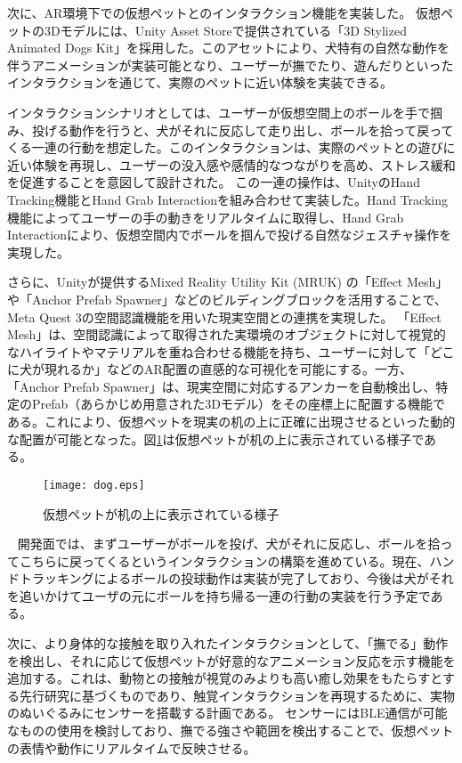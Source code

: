 \documentclass[a4j]{ltjsarticle}
\newcounter{seccnt}
\newcommand{\usection}[1]{\ \newline{\bf\underline{\theseccnt\stepcounter{seccnt}. #1}\hspace{10pt}}}
\begin{document}
次に、AR環境下での仮想ペットとのインタラクション機能を実装した。
仮想ペットの3Dモデルには、Unity Asset Storeで提供されている「3D Stylized Animated Dogs Kit」を採用した。このアセットにより、犬特有の自然な動作を伴うアニメーションが実装可能となり、ユーザーが撫でたり、遊んだりといったインタラクションを通じて、実際のペットに近い体験を実装できる。

インタラクションシナリオとしては、ユーザーが仮想空間上のボールを手で掴み、投げる動作を行うと、犬がそれに反応して走り出し、ボールを拾って戻ってくる一連の行動を想定した。このインタラクションは、実際のペットとの遊びに近い体験を再現し、ユーザーの没入感や感情的なつながりを高め、ストレス緩和を促進することを意図して設計された。
この一連の操作は、UnityのHand Tracking機能とHand Grab Interactionを組み合わせて実装した。Hand Tracking機能によってユーザーの手の動きをリアルタイムに取得し、Hand Grab Interactionにより、仮想空間内でボールを掴んで投げる自然なジェスチャ操作を実現した。

さらに、Unityが提供するMixed Reality Utility Kit (MRUK) の「Effect Mesh」や「Anchor Prefab Spawner」などのビルディングブロックを活用することで、Meta Quest 3の空間認識機能を用いた現実空間との連携を実現した。
「Effect Mesh」は、空間認識によって取得された実環境のオブジェクトに対して視覚的なハイライトやマテリアルを重ね合わせる機能を持ち、ユーザーに対して「どこに犬が現れるか」などのAR配置の直感的な可視化を可能にする。一方、「Anchor Prefab Spawner」は、現実空間に対応するアンカーを自動検出し、特定のPrefab（あらかじめ用意された3Dモデル）をその座標上に配置する機能である。これにより、仮想ペットを現実の机の上に正確に出現させるといった動的な配置が可能となった。図\ref{fig:dog}は仮想ペットが机の上に表示されている様子である。

\begin{figure}[b]
  \centering
  \texttt{[image: dog.eps]}
  \caption{仮想ペットが机の上に表示されている様子}
  \label{fig:dog}
\end{figure}


\usection{今後の計画}
開発面では、まずユーザーがボールを投げ、犬がそれに反応し、ボールを拾ってこちらに戻ってくるというインタラクションの構築を進めている。現在、ハンドトラッキングによるボールの投球動作は実装が完了しており、今後は犬がそれを追いかけてユーザの元にボールを持ち帰る一連の行動の実装を行う予定である。

次に、より身体的な接触を取り入れたインタラクションとして、「撫でる」動作を検出し、それに応じて仮想ペットが好意的なアニメーション反応を示す機能を追加する。これは、動物との接触が視覚のみよりも高い癒し効果をもたらすとする先行研究\cite{3}に基づくものであり、触覚インタラクションを再現するために、実物のぬいぐるみにセンサーを搭載する計画である。
センサーにはBLE通信が可能なものの使用を検討しており、撫でる強さや範囲を検出することで、仮想ペットの表情や動作にリアルタイムで反映させる。
\end{document}
